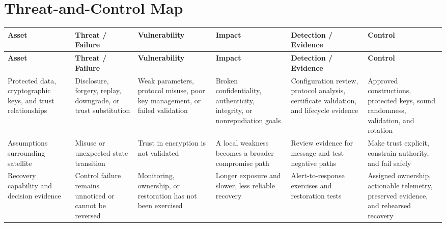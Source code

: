 \documentclass[11pt,letterpaper]{article}
\begin{document}
\section*{Threat-and-Control Map}
\begingroup\scriptsize\setlength{\tabcolsep}{2pt}
\begin{longtable}{>{\raggedright\arraybackslash}p{}>{\raggedright\arraybackslash}p{}>{\raggedright\arraybackslash}p{}>{\raggedright\arraybackslash}p{}>{\raggedright\arraybackslash}p{}>{\raggedright\arraybackslash}p{}}
\toprule\rowcolor{Navy}\color{white}\textbf{Asset} & \color{white}\textbf{Threat / Failure} & \color{white}\textbf{Vulnerability} & \color{white}\textbf{Impact} & \color{white}\textbf{Detection / Evidence} & \color{white}\textbf{Control}\\\midrule
\endfirsthead
\toprule\rowcolor{Navy}\color{white}\textbf{Asset} & \color{white}\textbf{Threat / Failure} & \color{white}\textbf{Vulnerability} & \color{white}\textbf{Impact} & \color{white}\textbf{Detection / Evidence} & \color{white}\textbf{Control}\\\midrule
\endhead
Protected data, cryptographic keys, and trust relationships & Disclosure, forgery, replay, downgrade, or trust substitution & Weak parameters, protocol misuse, poor key management, or failed validation & Broken confidentiality, authenticity, integrity, or nonrepudiation goals & Configuration review, protocol analysis, certificate validation, and lifecycle evidence & Approved constructions, protected keys, sound randomness, validation, and rotation\\\midrule
Assumptions surrounding satellite & Misuse or unexpected state transition & Trust in encryption is not validated & A local weakness becomes a broader compromise path & Review evidence for message and test negative paths & Make trust explicit, constrain authority, and fail safely\\\midrule
Recovery capability and decision evidence & Control failure remains unnoticed or cannot be reversed & Monitoring, ownership, or restoration has not been exercised & Longer exposure and slower, less reliable recovery & Alert-to-response exercises and restoration tests & Assigned ownership, actionable telemetry, preserved evidence, and rehearsed recovery\\\midrule
\bottomrule
\end{longtable}
\endgroup
\end{document}
